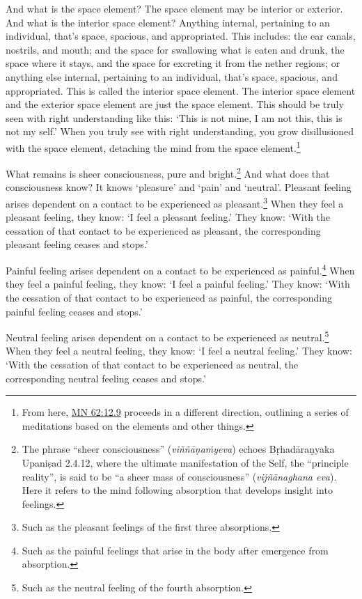 \documentclass[12pt,openany]{book}%
\begin{document}
And what is the space element? The space element may be interior or exterior. And what is the interior space element? Anything internal, pertaining to an individual, that’s space, spacious, and appropriated. This includes: the ear canals, nostrils, and mouth; and the space for swallowing what is eaten and drunk, the space where it stays, and the space for excreting it from the nether regions; or anything else internal, pertaining to an individual, that’s space, spacious, and appropriated. This is called the interior space element. The interior space element and the exterior space element are just the space element. This should be truly seen with right understanding like this: ‘This is not mine, I am not this, this is not my self.’ When you truly see with right understanding, you grow disillusioned with the space element, detaching the mind from the space element.\footnote{From here, \href{https://suttacentral.net/mn62/en/sujato\#12.9}{MN 62:12.9} proceeds in a different direction, outlining a series of meditations based on the elements and other things. } 

What remains is sheer consciousness, pure and bright.\footnote{The phrase “sheer consciousness” (\textit{\textsanskrit{viññāṇaṁyeva}}) echoes \textsanskrit{Bṛhadāraṇyaka} \textsanskrit{Upaniṣad} 2.4.12, where the ultimate manifestation of the Self, the “principle reality”, is said to be “a sheer mass of consciousness” (\textit{\textsanskrit{vijñānaghana} eva}). Here it refers to the mind following absorption that develops insight into feelings. } And what does that consciousness know? It knows ‘pleasure’ and ‘pain’ and ‘neutral’. Pleasant feeling arises dependent on a contact to be experienced as pleasant.\footnote{Such as the pleasant feelings of the first three absorptions. } When they feel a pleasant feeling, they know: ‘I feel a pleasant feeling.’ They know: ‘With the cessation of that contact to be experienced as pleasant, the corresponding pleasant feeling ceases and stops.’ 

Painful feeling arises dependent on a contact to be experienced as painful.\footnote{Such as the painful feelings that arise in the body after emergence from absorption. } When they feel a painful feeling, they know: ‘I feel a painful feeling.’ They know: ‘With the cessation of that contact to be experienced as painful, the corresponding painful feeling ceases and stops.’ 

Neutral feeling arises dependent on a contact to be experienced as neutral.\footnote{Such as the neutral feeling of the fourth absorption. } When they feel a neutral feeling, they know: ‘I feel a neutral feeling.’ They know: ‘With the cessation of that contact to be experienced as neutral, the corresponding neutral feeling ceases and stops.’ 
\end{document}
